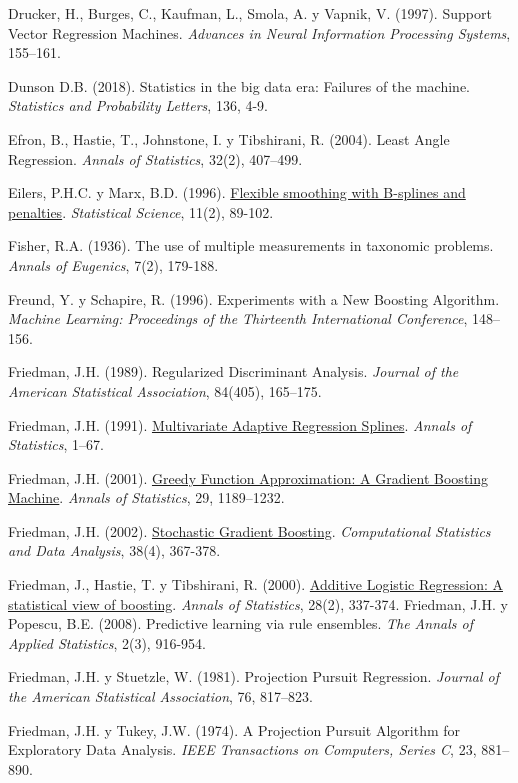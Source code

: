 \documentclass[
]{book}
\theoremstyle{break}
\theoremstyle{definition}
\theoremstyle{definition}
\theoremstyle{definition}
\theoremstyle{definition}
\theoremstyle{remark}
\begin{document}
Drucker, H., Burges, C., Kaufman, L., Smola, A. y Vapnik, V. (1997). Support Vector Regression Machines. \emph{Advances in Neural Information Processing Systems}, 155--161.

Dunson D.B. (2018). Statistics in the big data era: Failures of the machine. \emph{Statistics and Probability Letters}, 136, 4-9.

Efron, B., Hastie, T., Johnstone, I. y Tibshirani, R. (2004). Least Angle Regression. \emph{Annals of Statistics}, 32(2), 407--499.

Eilers, P.H.C. y Marx, B.D. (1996). \href{https://www.jstor.org/stable/pdf/2246049.pdf}{Flexible smoothing with B-splines and penalties}. \emph{Statistical Science}, 11(2), 89-102.

Fisher, R.A. (1936). The use of multiple measurements in taxonomic problems. \emph{Annals of Eugenics}, 7(2), 179-188.

Freund, Y. y Schapire, R. (1996). Experiments with a New Boosting Algorithm. \emph{Machine Learning: Proceedings of the Thirteenth International Conference}, 148--156.

Friedman, J.H. (1989). Regularized Discriminant Analysis. \emph{Journal of the American Statistical Association}, 84(405), 165--175.

Friedman, J.H. (1991). \href{https://projecteuclid.org/euclid.aos/1176347963}{Multivariate Adaptive Regression Splines}. \emph{Annals of Statistics}, 1--67.

Friedman, J.H. (2001). \href{https://projecteuclid.org/euclid.aos/1013203451}{Greedy Function Approximation: A Gradient Boosting Machine}. \emph{Annals of Statistics}, 29, 1189--1232.

Friedman, J.H. (2002). \href{https://www.sciencedirect.com/science/article/pii/S0167947301000652}{Stochastic Gradient Boosting}. \emph{Computational Statistics and Data Analysis}, 38(4), 367-378.

Friedman, J., Hastie, T. y Tibshirani, R. (2000). \href{https://projecteuclid.org/euclid.aos/1016218223}{Additive Logistic Regression: A statistical view of boosting}. \emph{Annals of Statistics}, 28(2), 337-374.
Friedman, J.H. y Popescu, B.E. (2008). Predictive learning via rule ensembles. \emph{The Annals of Applied Statistics}, 2(3), 916-954.

Friedman, J.H. y Stuetzle, W. (1981). Projection Pursuit Regression. \emph{Journal of the American Statistical Association}, 76, 817--823.

Friedman, J.H. y Tukey, J.W. (1974). A Projection Pursuit Algorithm for Exploratory Data Analysis. \emph{IEEE Transactions on Computers, Series C}, 23, 881--890.
\end{document}

